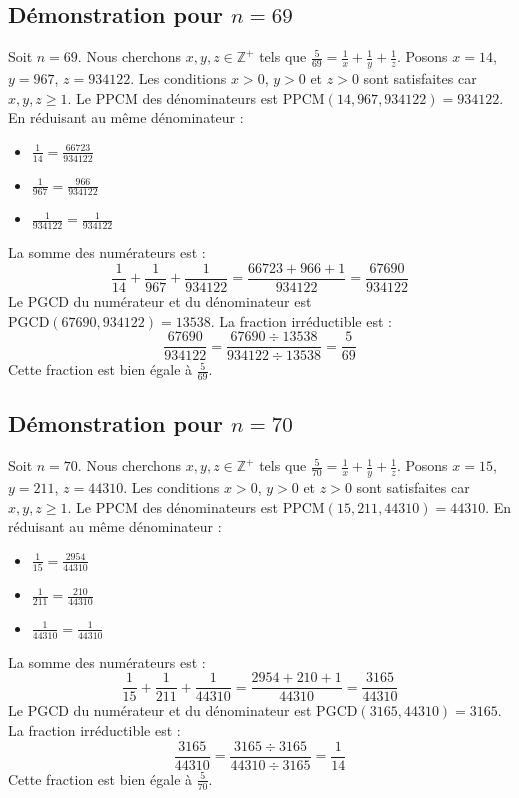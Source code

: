 \documentclass[11pt,a4paper]{article}
\begin{document}
\subsection{Démonstration pour $n = 69$}
Soit $n = 69$. Nous cherchons $x, y, z \in \mathbb{Z}^{+}$ tels que $\frac{5}{69} = \frac{1}{x} + \frac{1}{y} + \frac{1}{z}$.
Posons $x = 14$, $y = 967$, $z = 934122$.
Les conditions $x > 0$, $y > 0$ et $z > 0$ sont satisfaites car $x, y, z \geq 1$.
Le PPCM des dénominateurs est $\text{PPCM}(14, 967, 934122) = 934122$.
En réduisant au même dénominateur :
\begin{itemize}
    \item $\frac{1}{14} = \frac{66723}{934122}$
    \item $\frac{1}{967} = \frac{966}{934122}$
    \item $\frac{1}{934122} = \frac{1}{934122}$
\end{itemize}
La somme des numérateurs est :
$$ \frac{1}{14} + \frac{1}{967} + \frac{1}{934122} = \frac{66723 + 966 + 1}{934122} = \frac{67690}{934122} $$
Le PGCD du numérateur et du dénominateur est $\text{PGCD}(67690, 934122) = 13538$.
La fraction irréductible est :
$$ \frac{67690}{934122} = \frac{67690 \div 13538}{934122 \div 13538} = \frac{5}{69} $$
Cette fraction est bien égale à $\frac{5}{69}$.

\subsection{Démonstration pour $n = 70$}
Soit $n = 70$. Nous cherchons $x, y, z \in \mathbb{Z}^{+}$ tels que $\frac{5}{70} = \frac{1}{x} + \frac{1}{y} + \frac{1}{z}$.
Posons $x = 15$, $y = 211$, $z = 44310$.
Les conditions $x > 0$, $y > 0$ et $z > 0$ sont satisfaites car $x, y, z \geq 1$.
Le PPCM des dénominateurs est $\text{PPCM}(15, 211, 44310) = 44310$.
En réduisant au même dénominateur :
\begin{itemize}
    \item $\frac{1}{15} = \frac{2954}{44310}$
    \item $\frac{1}{211} = \frac{210}{44310}$
    \item $\frac{1}{44310} = \frac{1}{44310}$
\end{itemize}
La somme des numérateurs est :
$$ \frac{1}{15} + \frac{1}{211} + \frac{1}{44310} = \frac{2954 + 210 + 1}{44310} = \frac{3165}{44310} $$
Le PGCD du numérateur et du dénominateur est $\text{PGCD}(3165, 44310) = 3165$.
La fraction irréductible est :
$$ \frac{3165}{44310} = \frac{3165 \div 3165}{44310 \div 3165} = \frac{1}{14} $$
Cette fraction est bien égale à $\frac{5}{70}$.
\end{document}
